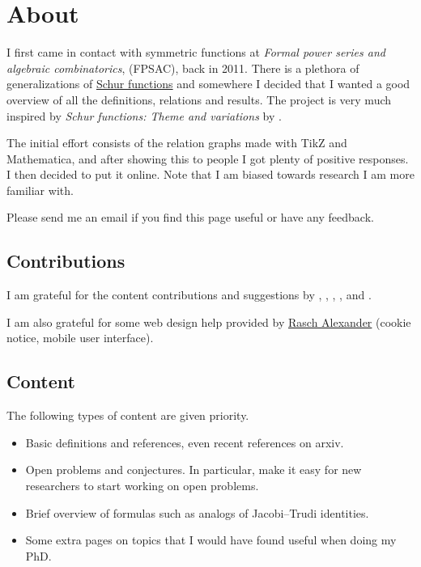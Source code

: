 

\section[about]{About}


I first came in contact with symmetric functions at \emph{Formal power series and algebraic combinatorics}, 
(FPSAC), back in 2011.
There is a plethora of generalizations of \hyperref[schurFunction]{Schur functions}
and somewhere I decided that
I wanted a good overview of all the definitions, relations and results.
The project is very much inspired by \emph{Schur functions: Theme and variations} by  \cite{Macdonald1992}.

The initial effort consists of the relation graphs made with TikZ and Mathematica,
and after showing this to people I got plenty of positive responses.
I then decided to put it online. Note that I am biased towards research I am more familiar with.

Please send me an email if you find this page useful or have any feedback.


\subsection[aboutContributions]{Contributions}

I am grateful for the content contributions and suggestions by 
,
,
,
,
and .

I am also grateful for some web design help provided by \href{https://alexrasch.github.io/}{Rasch Alexander} (cookie notice, mobile user interface).


\subsection[aboutContent]{Content}

The following types of content are given priority.

\begin{itemize}
\item  Basic definitions and references, even recent references on arxiv.
\item  Open problems and conjectures. In particular, make it easy for new researchers to start working on open problems.
\item  Brief overview of formulas such as analogs of Jacobi--Trudi identities.
\item  Some extra pages on topics that I would have found useful when doing my PhD.
\end{itemize}

